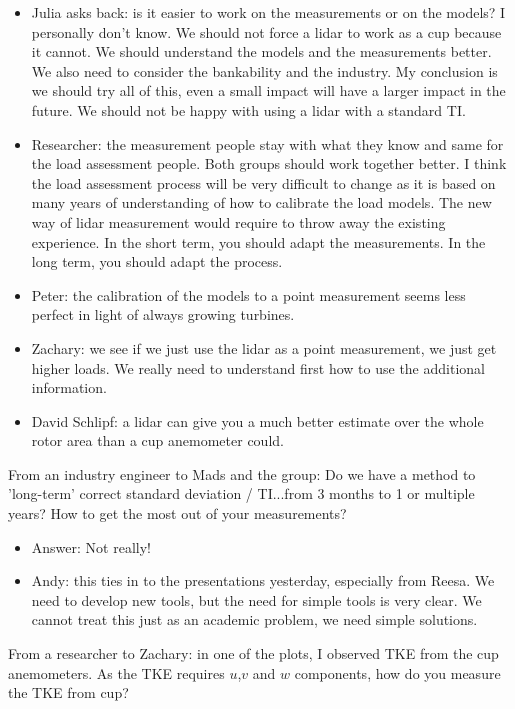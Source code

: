 \begin{itemize}
\item  Julia asks back: is it easier to work on the measurements or on the
  models? I personally don't know. We should not force a lidar to work
  as a cup because it cannot. We should understand the models and the
  measurements better. We also need to consider the bankability and the
  industry. My conclusion is we should try all of this, even a small
  impact will have a larger impact in the future. We should not be happy
  with using a lidar with a standard TI.
\item  Researcher: the measurement people stay with what they know and same
  for the load assessment people. Both groups should work together
  better. I think the load assessment process will be very difficult to
  change as it is based on many years of understanding of how to
  calibrate the load models. The new way of lidar measurement would
  require to throw away the existing experience. In the short term, you
  should adapt the measurements. In the long term, you should adapt the
  process.
\item  Peter: the calibration of the models to a point measurement seems less
  perfect in light of always growing turbines. 
\item Zachary: we see if we just use the lidar as a point measurement, we just get higher loads. We really need to understand first how to use the additional
  information.
\item  David Schlipf: a lidar can give you a much better estimate over the
  whole rotor area than a cup anemometer could.
\end{itemize}

From an industry engineer to Mads and the group: Do we have a method to
'long-term' correct standard deviation / TI...from 3 months to 1 or
multiple years? How to get the most out of your measurements?

\begin{itemize}
\item  Answer: Not really!
\item  Andy: this ties in to the presentations yesterday, especially from
  Reesa. We need to develop new tools, but the need for simple tools is
  very clear. We cannot treat this just as an academic problem, we
  need simple solutions.
\end{itemize}

From a researcher to Zachary: in one of the plots, I observed TKE from
the cup anemometers. As the TKE requires $u$,$v$ and $w$ components, how do
you measure the TKE from cup?

